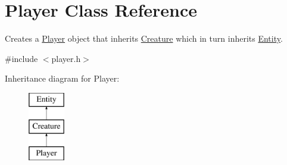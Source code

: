 \hypertarget{class_player}{\section{Player Class Reference}
\label{class_player}
}


Creates a \hyperlink{class_player}{Player} object that inherits \hyperlink{class_creature}{Creature} which in turn inherits \hyperlink{class_entity}{Entity}.  




{\ttfamily \#include $<$player.\+h$>$}

Inheritance diagram for Player\+:\begin{figure}[H]
\begin{center}
\leavevmode
\includegraphics[height=3.000000cm]{class_player}
\end{center}
\end{figure}
